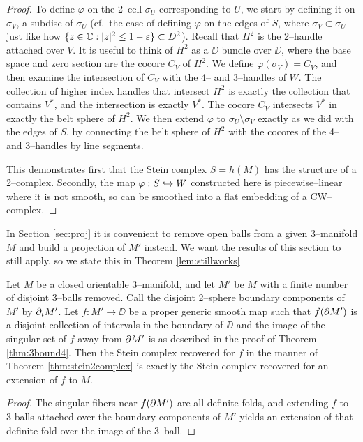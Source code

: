\begin{proof}
	To define $\varphi$ on the 2--cell $\sigma_U$ corresponding to $U$, we start by defining it on $\sigma_V$, a subdisc of $\sigma_U$ (cf.\ the case of defining $\varphi$ on the edges of $S$, where $\sigma_V\subset\sigma_U$ just like how $\{z\in\mathbb{C}:|z|^2\leq 1-\varepsilon\}\subset D^2$).
	Recall that	$H^2$ is the 2--handle attached over $V$.
	It is useful to think of $H^2$ as a $\DD$ bundle over $\DD$, where the base space and zero section are the cocore $C_V$ of $H^2$.
	We define $\varphi(\sigma_V)=C_V$, and then examine the intersection of $C_V$ with the 4-- and 3--handles of $W$.
	The collection of higher index handles that intersect $H^2$ is exactly the collection that contains $V^*$, and the intersection is exactly $V^*$.
	The cocore $C_V$ intersects $V^*$ in exactly the belt sphere of $H^2$.
	We then extend $\varphi$ to $\sigma_U\setminus\sigma_V$ exactly as we did with the edges of $S$, by connecting the belt sphere of $H^2$ with the cocores of the 4-- and 3--handles by line segments.
	
	This demonstrates first that the Stein complex $S=h(M)$ has the structure of a 2--complex.
	Secondly, the map $\varphi:S\hookrightarrow W$ constructed here is piecewise--linear where it is not smooth, so can be smoothed into a flat embedding of a CW--complex.											
\end{proof}

In Section \ref{sec:proj} it is convenient to remove open balls from a given 3--manifold $M$ and build a projection of $M'$ instead.
We want the results of this section to still apply, so we state this in Theorem \ref{lem:stillworks}

\begin{lem}
	\label{lem:stillworks}
	Let $M$ be a closed orientable 3--manifold, and let $M'$ be $M$ with a finite number of disjoint 3--balls removed.
	Call the disjoint 2--sphere boundary components of $M'$ by $\partial_i M'$.
	Let $f:M'\to\DD$ be a proper generic smooth map such that $f(\partial M')$ is a disjoint collection of intervals in the boundary of $\DD$ and the image of the singular set of $f$ away from $\partial M'$ is as described in the proof of Theorem \ref{thm:3bound4}.
	Then the Stein complex recovered for $f$ in the manner of Theorem \ref{thm:stein2complex} is exactly the Stein complex recovered for an extension of $f$ to $M$.
\end{lem}

\begin{proof}
	The singular fibers near $f(\partial M')$ are all definite folds, and extending $f$ to 3-balls attached over the boundary components of $M'$ yields an extension of that definite fold over the image of the 3--ball.
\end{proof}

